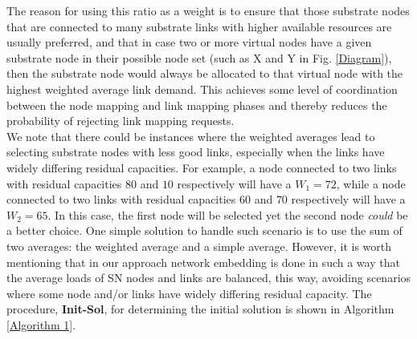 \documentclass[journal]{IEEEtran}
\begin{document}
\endgroup
The reason for using this ratio as a weight is to ensure that those substrate nodes that are connected to many substrate links with higher available resources are usually preferred, and that in case two or more virtual nodes have a given substrate node in their possible node set (such as X and Y in Fig. \ref{Diagram}), then the substrate node would always be allocated to that virtual node with the highest weighted average link demand. This achieves some level of coordination between the node mapping and link mapping phases and thereby reduces the probability of rejecting link mapping requests.\\
\indent We note that there could be instances where the weighted averages lead to selecting substrate nodes with less good links, especially when the links have widely differing residual capacities. For example, a node connected to two links with residual capacities $80$ and $10$ respectively will have a $W_1 = 72$, while a node connected to two links with residual capacities $60$ and $70$ respectively will have a $W_2 = 65$. In this case, the first node will be selected yet the second node \emph{could} be a better choice. One simple solution to handle such scenario is to use the sum of two averages: the weighted average and a simple average. However, it is worth mentioning that in our approach network embedding is done in such a way that the average loads of \ac{SN} nodes and links are balanced, this way, avoiding scenarios where some node and/or links have widely differing residual capacity. The procedure, \textbf{Init-Sol}, for determining the initial solution is shown in Algorithm \ref{Algorithm 1}.
\end{document}
